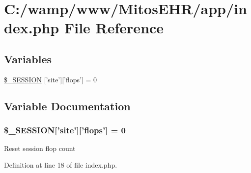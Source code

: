 \hypertarget{app_2index_8php}{\section{\-C\-:/wamp/www/\-Mitos\-E\-H\-R/app/index.php \-File \-Reference}
\label{app_2index_8php}
}
\subsection*{\-Variables}
\begin{DoxyCompactItemize}
\item 
\hyperlink{app_2index_8php_a99fda8552a3e58235643b79f5af3ded8}{\$\-\_\-\-S\-E\-S\-S\-I\-O\-N} \mbox{[}'site'\mbox{]}\mbox{[}'flops'\mbox{]} = 0
\end{DoxyCompactItemize}


\subsection{\-Variable \-Documentation}
\hypertarget{app_2index_8php_a99fda8552a3e58235643b79f5af3ded8}{
\subsubsection[{\$\-\_\-\-S\-E\-S\-S\-I\-O\-N}]{\setlength{\rightskip}{0pt plus 5cm}\$\-\_\-\-S\-E\-S\-S\-I\-O\-N\mbox{[}'site'\mbox{]}\mbox{[}'flops'\mbox{]} = 0}}\label{app_2index_8php_a99fda8552a3e58235643b79f5af3ded8}
\-Reset session flop count 

\-Definition at line 18 of file index.\-php.

